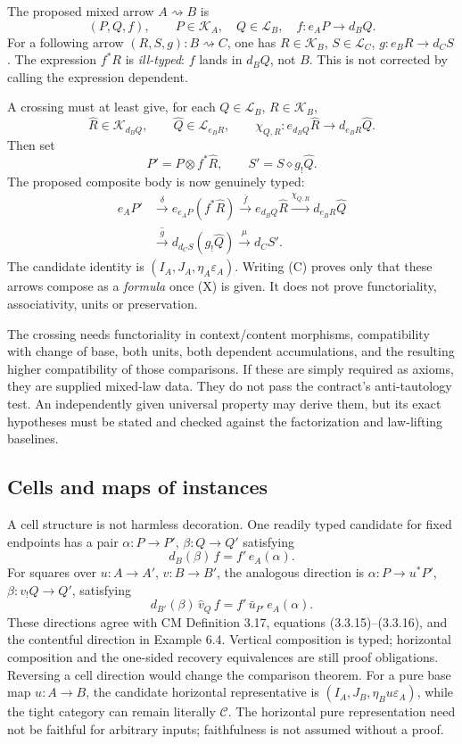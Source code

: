 \documentclass[11pt,a4paper]{article}
\newcommand{\C}{\mathcal C}
\newcommand{\K}{\mathcal K}
\newcommand{\Lcat}{\mathcal L}
\begin{document}
The proposed mixed arrow \(A\rightsquigarrow B\) is
\[
 (P,Q,f),\qquad P\in\K_A,\quad Q\in\Lcat_B,\quad f:e_AP\longrightarrow d_BQ.
\]
For a following arrow \((R,S,g):B\rightsquigarrow C\), one has
\(R\in\K_B\), \(S\in\Lcat_C\), \(g:e_BR\to d_CS\).
The expression \(f^*R\) is \emph{ill-typed}: \(f\) lands in \(d_BQ\), not
\(B\). This is not corrected by calling the expression dependent.

A crossing must at least give, for each \(Q\in\Lcat_B\), \(R\in\K_B\),
\[
 \widehat R\in\K_{d_BQ},\qquad
 \widehat Q\in\Lcat_{e_BR},\qquad
 \chi_{Q,R}:e_{d_BQ}\widehat R\longrightarrow d_{e_BR}\widehat Q.
 \tag{X}
\]
Then set
\[
 P'=P\otimes f^*\widehat R,
 \qquad S'=S\diamond g_!\widehat Q.
\]
The proposed composite body is now genuinely typed:
\begin{align*}
 e_A P'
 &\xrightarrow{\delta}e_{e_AP}(f^*\widehat R)
 \xrightarrow{\bar f}e_{d_BQ}\widehat R
 \xrightarrow{\chi_{Q,R}}d_{e_BR}\widehat Q\\
 &\xrightarrow{\widehat g}d_{d_CS}(g_!\widehat Q)
 \xrightarrow{\mu}d_C S'.
 \tag{C}
\end{align*}
The candidate identity is \((I_A,J_A,\eta_A\varepsilon_A)\).
Writing (C) proves only that these arrows compose as a \emph{formula} once
(X) is given. It does not prove functoriality, associativity, units or preservation.

The crossing needs functoriality in context/content morphisms, compatibility
with change of base, both units, both dependent accumulations, and the resulting
higher compatibility of those comparisons. If these are simply required as
axioms, they are supplied mixed-law data. They do not pass the contract's
anti-tautology test. An independently given universal property may derive them,
but its exact hypotheses must be stated and checked against the factorization
and law-lifting baselines.

\subsection{Cells and maps of instances}

A cell structure is not harmless decoration. One readily typed candidate for
fixed endpoints has a pair \(\alpha:P\to P'\), \(\beta:Q\to Q'\) satisfying
\[
 d_B(\beta)\, f=f'\,e_A(\alpha).
 \tag{H}
\]
For squares over \(u:A\to A'\), \(v:B\to B'\), the analogous direction is
\(\alpha:P\to u^*P'\), \(\beta:v_!Q\to Q'\), satisfying
\[
 d_{B'}(\beta)\,\widehat v_Q\,f
 = f'\,\bar u_{P'}\,e_A(\alpha).
\]
These directions agree with CM Definition 3.17, equations (3.3.15)--(3.3.16),
and the contentful direction in Example 6.4. Vertical composition is typed;
horizontal composition and the one-sided recovery equivalences are still proof
obligations. Reversing a cell direction would change the comparison theorem.
For a pure base map \(u:A\to B\), the candidate horizontal representative is
\((I_A,J_B,\eta_Bu\varepsilon_A)\), while the tight category can remain literally
\(\C\). The horizontal pure representation need not be faithful for arbitrary
inputs; faithfulness is not assumed without a proof.
\end{document}
